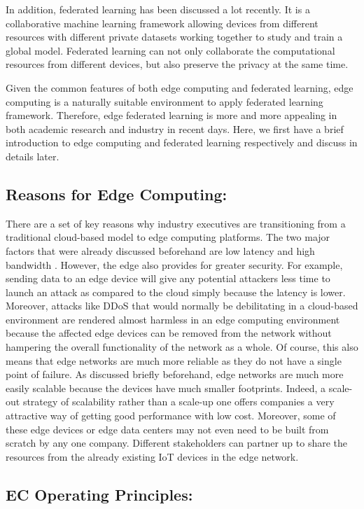 In addition, federated learning has been discussed a lot recently. It is a collaborative machine learning framework allowing devices from different resources with different private datasets working together to study and train a global model. Federated learning can not only collaborate the computational resources from different devices, but also preserve the privacy at the same time.


Given the common features of both edge computing and federated learning, edge computing is a naturally suitable environment to apply federated learning framework. Therefore, edge federated learning is more and more appealing in both academic research and industry in recent days. Here, we first have a brief introduction to edge computing and federated learning respectively and discuss in details later. 

\subsection{Reasons for Edge Computing:}

There are a set of key reasons why industry executives are transitioning from 
a traditional cloud-based model to edge computing platforms. The two major factors that were already discussed beforehand are low latency and high bandwidth \cite{satyanarayanan2017emergence}. However, the edge also provides for greater security. For example, sending data to an edge device will give any potential attackers less time to launch an attack as compared to the cloud simply because the latency is lower. Moreover, attacks like DDoS that would normally be debilitating in a cloud-based environment are rendered almost harmless in an edge computing environment because the affected edge devices can be removed from the network without hampering the overall functionality of the network as a whole. Of course, this also means that edge networks are much more reliable as they do not have a single point of failure. As discussed briefly beforehand, edge networks are much more easily scalable because the devices have much smaller footprints. Indeed, a scale-out strategy of scalability rather than a scale-up one offers companies a very attractive way of getting good performance with low cost. Moreover, some of these edge devices or edge data centers may not even need to be built from scratch by any one company. Different stakeholders can partner up to share the resources from the already existing IoT devices in the edge network.


\subsection{EC Operating Principles:}

